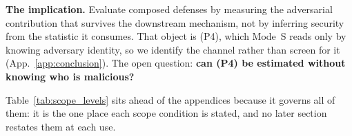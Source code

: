 \documentclass{article}
\begin{document}
\textbf{The implication.} Evaluate composed defenses by measuring the adversarial contribution that survives the downstream mechanism, not by inferring security from the statistic it consumes. That object is (P4), which Mode~S reads only by knowing adversary identity, so we identify the channel rather than screen for it (App.~\ref{app:conclusion}). The open question: \textbf{can (P4) be estimated without knowing who is malicious?}





\appendix
\clearpage

\noindent Table~\ref{tab:scope_levels} sits ahead of the appendices because it governs all of them: it is the one place each scope condition is stated, and no later section restates them at each use.
\end{document}
